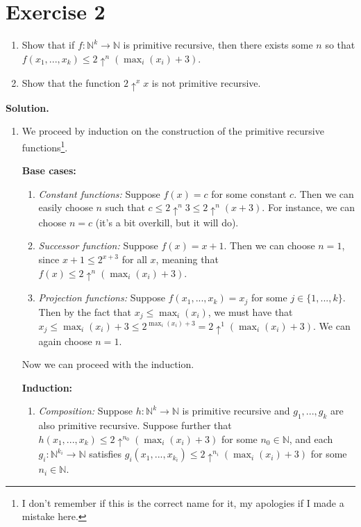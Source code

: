 \documentclass{article}
\newcommand{\nat}{\mathbb{N}}
\newcommand{\solution}{\noindent \textbf{Solution.}}
\begin{document}
\newpage
\section*{Exercise 2}
\begin{enumerate}
    \item Show that if $f:\nat^k \to \nat$ is primitive recursive, then there exists some $n$ so that $f(x_1, ..., x_k) \leq 2 \uparrow^n(\max_i(x_i)+3)$.
    \item Show that the function $2\uparrow^x x$ is not primitive recursive.
\end{enumerate}

\vspace{3mm}
\solution

\begin{enumerate}
    \item We proceed by induction on the construction of the primitive recursive functions\footnote{I don't remember if this is the correct name for it, my apologies if I made a mistake here.}.

    \textbf{Base cases:}

    \begin{enumerate}
        \item \textit{Constant functions:} Suppose $f(x) = c$ for some constant $c$.
        Then we can easily choose $n$ such that $c \leq 2\uparrow^n 3 \leq 2\uparrow^n (x + 3)$.
        For instance, we can choose $n = c$ (it's a bit overkill, but it will do).
        \item \textit{Successor function:} Suppose $f(x) = x + 1$.
        Then we can choose $n = 1$, since $x + 1 \leq 2^{x + 3}$ for all $x$, meaning that $f(x) \leq 2 \uparrow^n (\max_i(x_i) + 3)$.
        \item \textit{Projection functions:} Suppose $f(x_1, ..., x_k) = x_j$ for some $j \in \{1, ..., k\}$.
        Then by the fact that $x_j \leq \max_i(x_i)$, we must have that
        $x_j \leq \max_i(x_i) + 3 \leq 2^{\max_i(x_i) + 3} = 2\uparrow^1(\max_i(x_i) + 3)$.
        We can again choose $n = 1$.
    \end{enumerate}
    Now we can proceed with the induction.

    \textbf{Induction:}

    \begin{enumerate}
        \item \textit{Composition:} Suppose $h: \nat ^k \to \nat$ is primitive recursive and $g_1, ..., g_k$ are also primitive recursive.
        Suppose further that $h(x_1, ..., x_k) \leq 2\uparrow^{n_0}(\max_i(x_i)+ 3)$ for some $n_0 \in \nat$, and each $g_i : \nat^{k_i} \to \nat$ satisfies $g_i(x_1, ..., x_{k_i}) \leq 2\uparrow^{n_i}(\max_i(x_i) + 3)$ for some $n_i \in \nat$.


\end{enumerate}
\end{enumerate}
\end{document}
